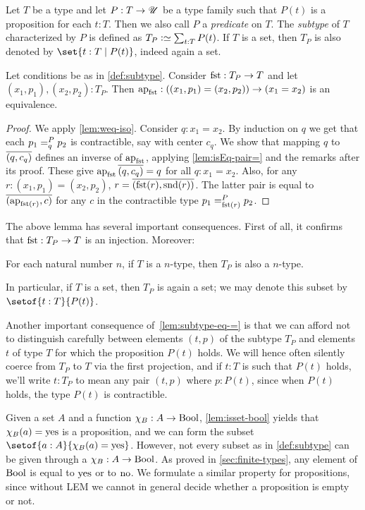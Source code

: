 \begin{definition}\label{def:subtype}
Let $T$ be a type and let $P: T\to{\mathscr{U}}$ be a type family such that
$P(t)$ is a proposition for each $t:T$. Then we also
call $P$ a \emph{predicate} on $T$.
The \emph{subtype} of $T$ characterized by $P$ is defined 
as $T_P\defeq \sum_{t:T} P(t)$.
If $T$ is a set, then $T_P$
is also denoted by $\set{t:T \mid P(t)}$, indeed again a set.
\end{definition}

\begin{lemma}\label{lem:subtype-eq-=}
Let conditions be as in \cref{def:subtype}. Consider $\fst: T_P \to T$
and let $(x_1,p_1),(x_2,p_2) : T_P$.
Then $\ap{\fst}: ((x_1,p_1) = (x_2,p_2)) \to (x_1 = x_2)$ is an equivalence.
\end{lemma}

\begin{proof}
We apply \cref{lem:weq-iso}. Consider $q: x_1 = x_2$.
By induction on $q$ we get that each $\pathover {p_1} P q {p_2}$ is contractible,
say with center $c_q$. We show that 
mapping $q$ to $\overline{({q},{c_q})}$ defines an inverse of $\ap{\fst}$,
applying \cref{lem:isEq-pair=} and the remarks after its proof.
These give $\ap{\fst}\pathpair q {c_q} = q$ for all $q: x_1 = x_2$.
Also, for any $r: (x_1,p_1)=(x_2,p_2)$, $r=\pathpair{\fst(r)}{\snd(r)}$.
The latter pair is equal to $\pathpair{\ap{\fst(r)}}{c}$ for any $c$
in the contractible type $\pathover {p_1} P {\fst(r)} {p_2}$.
\end{proof}
The above lemma has several important consequences.
First of all, it confirms that $\fst: T_P \to T$ is an injection.
Moreover:
\begin{corollary}\label{cor:subtype-same-level}
  For each natural number $n$,
  if $T$ is a $n$-type, then $T_P$ is also a $n$-type.
\end{corollary}
In particular, if $T$ is a set, then $T_P$ is again a set; 
we may denote this subset by $\setof{t:T}{P(t)}$.

\begin{remark}\label{rem:subtype-convention}
  Another important consequence of~\cref{lem:subtype-eq-=}
  is that we can afford not to distinguish carefully
  between elements $(t,p)$ of the subtype $T_P$
  and elements $t$ of type $T$ for which the proposition $P(t)$ holds.
  We will hence often silently coerce from $T_P$ to $T$ via the first projection,
  and if $t:T$ is such that $P(t)$ holds, we'll write $t:T_P$
  to mean any pair $(t,p)$ where $p:P(t)$,
  since when $P(t)$ holds, the type $P(t)$ is contractible.
\end{remark}
Given a set $A$ and a function $\chi_B: A\to\mathrm{Bool}$,
\cref{lem:isset-bool} yields that $\chi_B(a) = \mathrm{yes}$ is a
proposition, and we can form
the subset $\setof{a:A}{\chi_B(a) = \yes}$. However,
not every subset as in \cref{def:subtype} can be given
through a $\chi_B: A\to\mathrm{Bool}$. As proved in \cref{sec:finite-types},
any element of $\mathrm{Bool}$ is equal to $\mathrm{yes}$ or to $\mathrm{no}$.
We formulate a similar property for propositions, since without LEM
we cannot in general decide whether a proposition is empty or not.

